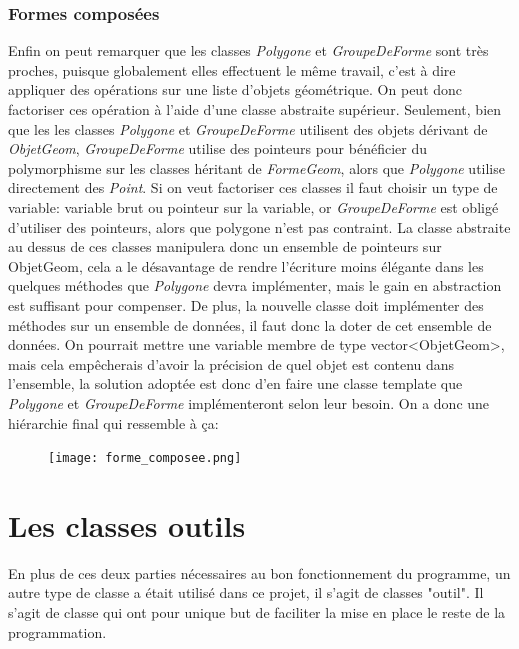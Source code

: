 \documentclass[10pt,a4paper]{report}
\begin{document}
\begin{spacing}{0.8}
\subsubsection{Formes composées}
Enfin on peut remarquer que les classes \textit{Polygone} et \textit{GroupeDeForme} sont très proches, puisque globalement elles effectuent le même travail, c'est à dire appliquer des opérations sur une liste d'objets géométrique. On peut donc factoriser ces opération à l'aide d'une classe abstraite supérieur. Seulement, bien que les les classes \textit{Polygone} et \textit{GroupeDeForme} utilisent des objets dérivant de \textit{ObjetGeom}, \textit{GroupeDeForme} utilise des pointeurs pour bénéficier du polymorphisme sur les classes héritant de \textit{FormeGeom}, alors que \textit{Polygone} utilise directement des \textit{Point}. Si on veut factoriser ces classes il faut choisir un type de variable: variable brut ou pointeur sur la variable, or \textit{GroupeDeForme} est obligé d'utiliser des pointeurs, alors que polygone n'est pas contraint. La classe abstraite au dessus de ces classes manipulera donc un ensemble de pointeurs sur ObjetGeom, cela a le désavantage de rendre l'écriture moins élégante dans les quelques méthodes que \textit{Polygone} devra implémenter, mais le gain en abstraction est suffisant pour compenser.
De plus, la nouvelle classe doit implémenter des méthodes sur un ensemble de données, il  faut donc la doter de cet ensemble de données. On pourrait mettre une variable membre de type vector<ObjetGeom>, mais cela empêcherais d'avoir la précision de quel objet est contenu dans l'ensemble, la solution adoptée est donc d'en faire une classe template que \textit{Polygone} et \textit{GroupeDeForme} implémenteront selon leur besoin.
On a donc une hiérarchie final qui ressemble à ça:
\begin{figure}[H]
\texttt{[image: forme\_composee.png]}
\end{figure}





\section{Les classes outils}\label{classesOutils}
En plus de ces deux parties nécessaires au bon fonctionnement du programme, un autre type de classe a était utilisé dans ce projet, il s'agit de classes "outil". Il s'agit de classe qui ont pour unique but de faciliter la mise en place le reste de la programmation.

\end{spacing}
\end{document}
